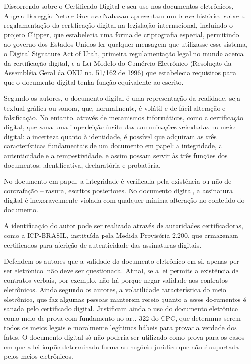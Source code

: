 	Discorrendo sobre o Certificado Digital e seu uso nos
  documentos eletrônicos, Angelo Boreggio Neto e Gustavo Nahasan
  apresentam um breve histórico sobre a regulamentação da
  certificação digital na legislação internacional, incluindo o
  projeto Clipper, que estabelecia uma forma de criptografia
  especial, permitindo ao governo dos Estados Unidos ler qualquer
  mensagem que utilizasse esse sistema, o Digital Signature Act
  of Utah, primeira regulamentação legal no mundo acerca da
  certificação digital, e a Lei Modelo do Comércio Eletrônico
  (Resolução da Assembléia Geral da ONU no. 51/162 de 1996) que
  estabelecia requisitos para que o documento digital tenha
  função equivalente ao escrito. \par
	
	Segundo os autores, o documento digital é uma representação da
  realidade, seja textual gráfica ou sonora, que, normalmente, é
  volátil e de fácil alteração e falsificação. No entanto,
  através de mecanismos informáticos, como a certificação
  digital, que sana uma imperfeição ínsita das comunicações
  veiculadas no meio digital: a incerteza quanto à identidade, é
  possível que adquiram as três características fundamentais de
  um documento em papel: a integridade, a autenticidade e a
  tempestividade, e assim possam servir às três funções dos
  documentos: identificativa, declaratória e probatória. \par
	
	No documento em papel, a integridade é verificada pela
  existência ou não de contrafação – rasura, escritos
  posteriores. No documento digital, a assinatura digital é
  inexoravelmente violada com qualquer mínima alteração no
  conteúdo do documento.\par
	
	A identificação do autor pode ser realizada através de
  autoridades certificadoras, como a ICP-BRASIL, instituída pela
  Medida Provisória 2.200, que armazenam certificados para
  aferição de autenticidade das assinaturas digitais. \par
	
	Defendem os autores que a validade do documento eletrônico em
  si, apenas por ser eletrônico, não deve ser questionada.
  Afinal, se a lei permite a existência de contratos verbais, por
  exemplo, não há porque negar validade aos contratos
  eletrônicos. Ainda segundo os autores, a volatilidade
  característica do meio eletrônico, que faz algumas pessoas
  manterem receio quanto a esses documentos é sanada pelo
  certificado digital. Justificam ainda o uso do documento
  eletrônico como meio de prova com fundamento no art. 322 do
  CPC, que determina serem todos os meios legais e moralmente
  legítimos hábeis para provar a verdade dos fatos. O documento
  digital só não poderia ser utilizado como prova para os casos
  em que a lei impõe determinada forma ao negócio jurídico que
  não é suportada pelos meios eletrônicos. \par
	
